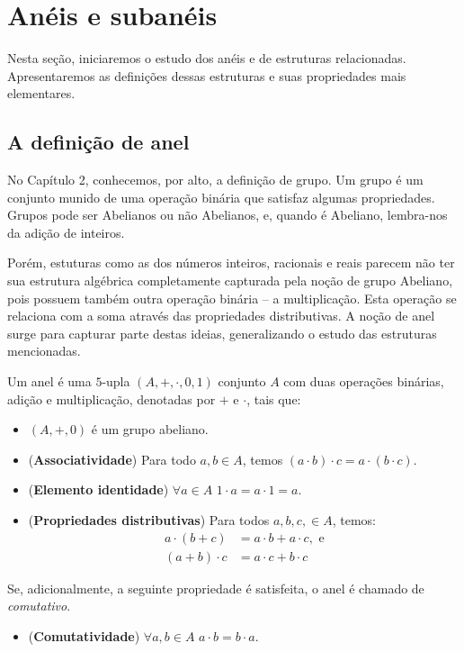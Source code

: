 \chapter{Anéis e subanéis}
Nesta seção, iniciaremos o estudo dos anéis e de estruturas relacionadas. Apresentaremos as definições dessas estruturas e suas propriedades mais elementares.

\section{A definição de anel}
No Capítulo 2, conhecemos, por alto, a definição de grupo.
Um grupo é um conjunto munido de uma operação binária que satisfaz algumas propriedades.
Grupos pode ser Abelianos ou não Abelianos, e, quando é Abeliano, lembra-nos da adição de inteiros.

Porém, estuturas como as dos números inteiros, racionais e reais parecem não ter sua estrutura algébrica completamente capturada pela noção de grupo Abeliano, pois possuem também outra operação binária -- a multiplicação.
Esta operação se relaciona com a soma através das propriedades distributivas. A noção de anel surge para capturar parte destas ideias, generalizando o estudo das estruturas mencionadas.
\begin{definition}[Anel]
    Um anel é uma $5$-upla $(A, +, \cdot, 0, 1)$ conjunto $A$ com duas operações binárias, adição e multiplicação, denotadas por $+$ e $\cdot$, tais que:
    \begin{itemize}
        \item $(A, +, 0)$ é um grupo abeliano.
        \item (\textbf{Associatividade}) Para todo $a, b \in A$, temos $(a \cdot b)\cdot c = a\cdot(b\cdot c)$.
        \item (\textbf{Elemento identidade}) $\forall a \in A$ $1 \cdot a = a \cdot 1 = a$.
        \item (\textbf{Propriedades distributivas}) Para todos $a, b, c, \in A$, temos:
        \begin{align*}
            a \cdot (b + c) &= a \cdot b + a \cdot c, \text{ e}\\
            (a + b) \cdot c &= a \cdot c + b \cdot c
        \end{align*}
    \end{itemize}
    Se, adicionalmente, a seguinte propriedade é satisfeita, o anel é chamado de \emph{comutativo}.
    \begin{itemize}
        \item (\textbf{Comutatividade}) $\forall a, b \in A$ $a \cdot b = b \cdot a$.
    \end{itemize}
\end{definition}

